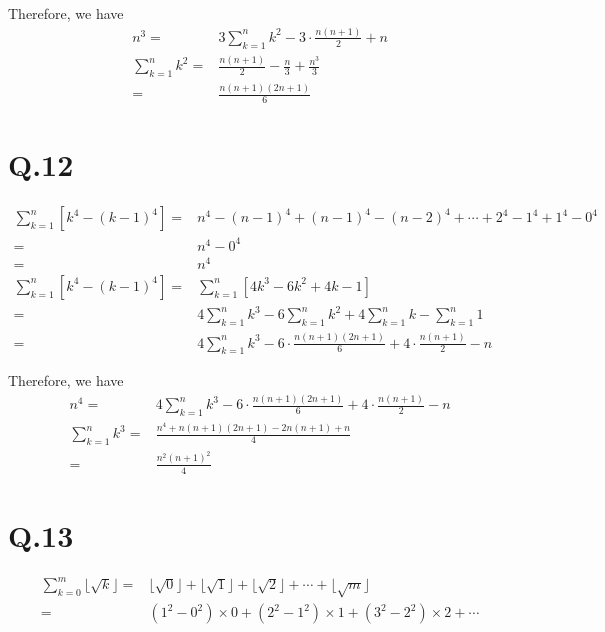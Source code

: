 \documentclass[a4paper,12pt]{article}
\begin{document}
Therefore, we have
\begin{align*}
	n^3 =& 3\sum_{k = 1}^{n} k^2 - 3\cdot \frac{n(n+1)}{2} + n\\
	\sum_{k = 1}^{n} k^2 =& \frac{n(n+1)}{2} - \frac{n}{3} + \frac{n^3}{3}\\
	=& \frac{n(n+1)(2n+1)}{6}
\end{align*}

\section*{Q.12}
\begin{align*}
	\sum_{k = 1}^{n} [k^4 - (k - 1)^4] =& n^4 - (n-1)^4 + (n-1)^4 - (n-2)^4 + \cdots + 2^4 - 1^4 + 1^4 - 0^4\\
	=& n^4 - 0^4\\
	=& n^4\\
	\sum_{k = 1}^{n} [k^4 - (k - 1)^4] =& \sum_{k = 1}^{n} [4k^3 - 6k^2 + 4k - 1]\\
	=& 4\sum_{k = 1}^{n} k^3 - 6\sum_{k = 1}^{n} k^2 + 4\sum_{k = 1}^{n} k - \sum_{k = 1}^{n} 1\\
	=& 4\sum_{k = 1}^{n} k^3 - 6\cdot \frac{n(n+1)(2n+1)}{6} + 4\cdot \frac{n(n+1)}{2} - n
\end{align*}

Therefore, we have
\begin{align*}
	n^4 =& 4\sum_{k = 1}^{n} k^3 - 6\cdot \frac{n(n+1)(2n+1)}{6} + 4\cdot \frac{n(n+1)}{2} - n\\
	\sum_{k = 1}^{n} k^3 =& \frac{n^4 + n(n+1)(2n+1) - 2n(n+1) + n}{4}\\
	=& \frac{n^2(n+1)^2}{4}
\end{align*}

\section*{Q.13}
\begin{align*}
	\sum_{k = 0}^{m} \lfloor \sqrt{k} \rfloor =& \lfloor \sqrt{0} \rfloor + \lfloor \sqrt{1} \rfloor + \lfloor \sqrt{2} \rfloor + \cdots + \lfloor \sqrt{m} \rfloor\\
	=& (1^2 - 0^2) \times 0 + (2^2 - 1^2) \times 1 + (3^2 - 2^2) \times 2 + \cdots
\end{align*}
\end{document}
